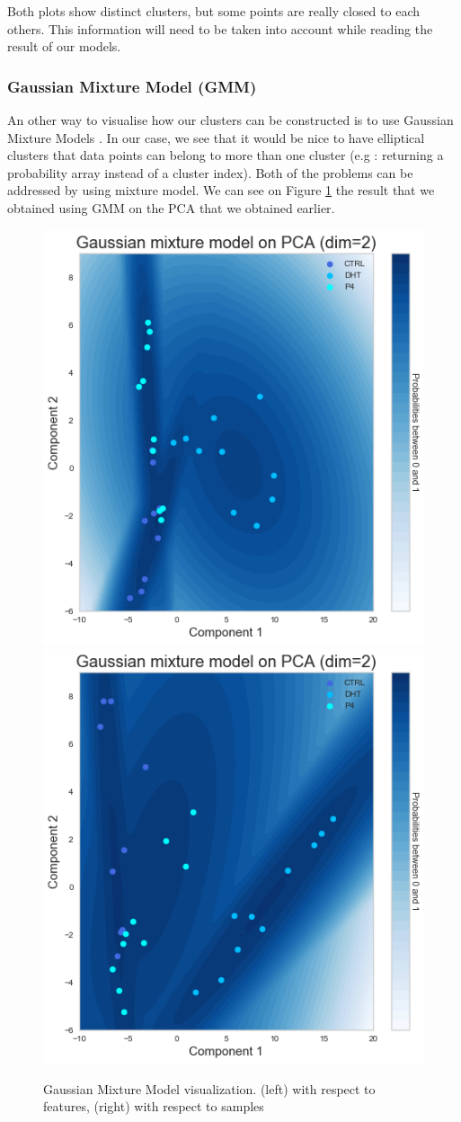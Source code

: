 \documentclass[10pt,conference,compsocconf]{IEEEtran}
\begin{document}
Both plots show distinct clusters, but some points are really closed to each others. This information will need to be taken into account while reading the result of our models.

\subsubsection{Gaussian Mixture Model (GMM)}

An other way to visualise how our clusters can be constructed is to use Gaussian Mixture Models \cite{Murphy:2012:MLP:2380985}. In our case, we see that it would be nice to have elliptical clusters that data points can belong to more than one cluster (e.g : returning a probability array instead of a cluster index). Both of the problems can be addressed by using mixture model. We can see on Figure \ref{fig:gmm} the result that we obtained using GMM on the PCA that we obtained earlier.

\begin{figure}[H]
    \centering
    \includegraphics[width=0.48\columnwidth]{figures/Gaussian_mixture_3_feature_normalized.png}
    \includegraphics[width=0.48\columnwidth]{figures/Gaussian_mixture_3_sample_normalized.png}
    \caption{Gaussian Mixture Model visualization. (left) with respect to features, (right) with respect to samples}
    \label{fig:gmm}
\end{figure}
\end{document}

